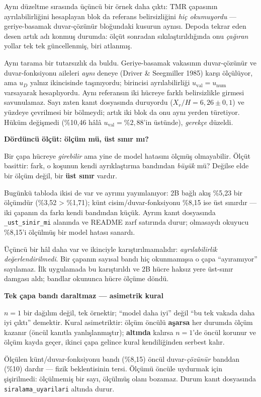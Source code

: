 \documentclass[11pt,a4paper]{article}
\newcommand{\kkkenar}{lacivert}
\newcommand{\kkzemin}{kod}
\newenvironment{renkkutu}[3]{%
  \renewcommand{\kkkenar}{#1}\renewcommand{\kkzemin}{#2}%
  \par\medskip\noindent
  \begin{lrbox}{\kutugovde}%
  \begin{minipage}{\dimexpr\linewidth-2\fboxsep-2\fboxrule\relax}\footnotesize
  \textcolor{#1}{\textbf{#3}}\par\vspace{3pt}%
}{%
  \end{minipage}%
  \end{lrbox}%
  \noindent\fcolorbox{\kkkenar}{\kkzemin}{\usebox{\kutugovde}}%
  \par\medskip
}
\newenvironment{dikkat}[1]{\begin{renkkutu}{orta}{ortabg}{#1}}{\end{renkkutu}}
\newenvironment{anafikir}[1]{\begin{renkkutu}{lacivert}{kod}{#1}}{\end{renkkutu}}
\begin{document}
\noindent Aynı düzeltme sırasında üçüncü bir örnek daha çıktı: TMR çapasının
ayrılabilirliğini hesaplayan blok da referans belirsizliğini \emph{hiç
okumuyordu} --- geriye-basamak duvar-çözünür bloğundaki kusurun aynısı. Depoda
tekrar eden desen artık adı konmuş durumda: ölçüt sonradan sıkılaştırıldığında
onu \emph{çağıran} yollar tek tek güncellenmiş, biri atlanmış.

Aynı tarama bir tutarsızlık da buldu. Geriye-basamak vakasının duvar-çözünür ve
duvar-fonksiyonu aileleri \emph{aynı} deneye (Driver \& Seegmiller 1985) karşı
ölçülüyor, ama $u_D$ yalnız ikincisinde taşınıyordu; birincisi ayrılabilirliği
$u_{\mathrm{val}} = u_{\mathrm{num}}$ varsayarak hesaplıyordu. Aynı referansın
iki hücreye farklı belirsizlikle girmesi savunulamaz. Sayı zaten kanıt
dosyasında duruyordu ($X_r/H = 6{,}26 \pm 0{,}1$) ve yüzdeye çevrilmesi bir
bölmeydi; artık iki blok da onu aynı yerden türetiyor. Hüküm değişmedi
(\%10{,}46 hâlâ $u_{\mathrm{val}}=\%2{,}88$'in üstünde), \emph{gerekçe} düzeldi.

\begin{dikkat}{Dördüncü ölçüt: ölçüm mü, üst sınır mı?}
Bir çapa hücreye \emph{girebilir} ama yine de model hatasını ölçmüş olmayabilir.
Ölçüt basittir: fark, o koşunun kendi ayrıklaştırma bandından \emph{büyük} mü?
Değilse elde bir ölçüm değil, bir \textbf{üst sınır} vardır.

Bugünkü tabloda ikisi de var ve ayrımı yayımlanıyor: 2B bağlı akış \%5{,}23 bir
ölçümdür (\%3{,}52 > \%1{,}71); künt cisim/duvar-fonksiyonu \%8{,}15 ise üst
sınırdır --- iki çapanın da farkı kendi bandından küçük. Ayrım kanıt dosyasında
\texttt{\_ust\_sinir\_mi} alanında ve README zarf satırında durur; olmasaydı
okuyucu \%8{,}15'i ölçülmüş bir model hatası sanardı.

Üçüncü bir hâl daha var ve ikinciyle karıştırılmamalıdır:
\emph{ayrılabilirlik değerlendirilmedi}. Bir çapanın sayısal bandı hiç
okunmamışsa o çapa ``ayıramıyor'' sayılamaz. İlk uygulamada bu karıştırıldı ve
2B hücre haksız yere üst-sınır damgası aldı; bandlar okununca hücre ölçüme
döndü.
\end{dikkat}

\begin{anafikir}{Tek çapa bandı daraltmaz --- asimetrik kural}
$n{=}1$ bir dağılım değil, tek örnektir; ``model daha iyi'' değil ``bu tek
vakada daha iyi çıktı'' demektir. Kural asimetriktir: ölçüm öncülü
\textbf{aşarsa} her durumda ölçüm kazanır (öncül kanıtla yanlışlanmıştır);
\textbf{altında} kalırsa $n{=}1$'de öncül korunur ve ölçüm kayda geçer, ikinci
çapa gelince kural kendiliğinden serbest kalır.

Ölçülen künt/duvar-fonksiyonu bandı (\%8{,}15) öncül duvar-\emph{çözünür}
banddan (\%10) dardır --- fizik beklentisinin tersi. Ölçümü öncüle uydurmak için
şişirilmedi: ölçülmemiş bir sayı, ölçülmüş olanı bozamaz. Durum kanıt
dosyasında \texttt{siralama\_uyarilari} altında durur.
\end{anafikir}
\end{document}
